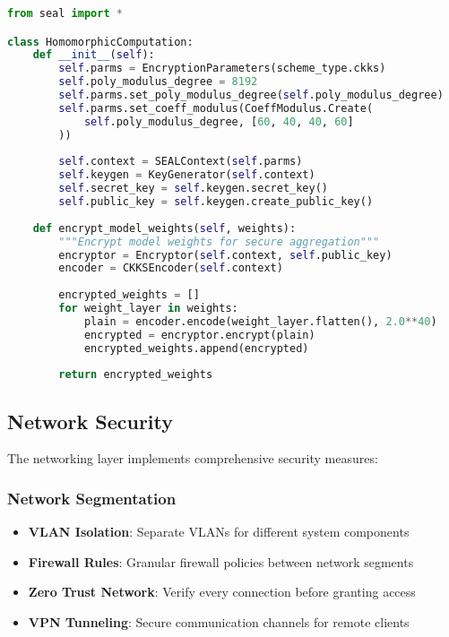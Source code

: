 \begin{lstlisting}[language=python, caption=Homomorphic Encryption Integration]
from seal import *

class HomomorphicComputation:
    def __init__(self):
        self.parms = EncryptionParameters(scheme_type.ckks)
        self.poly_modulus_degree = 8192
        self.parms.set_poly_modulus_degree(self.poly_modulus_degree)
        self.parms.set_coeff_modulus(CoeffModulus.Create(
            self.poly_modulus_degree, [60, 40, 40, 60]
        ))
        
        self.context = SEALContext(self.parms)
        self.keygen = KeyGenerator(self.context)
        self.secret_key = self.keygen.secret_key()
        self.public_key = self.keygen.create_public_key()
        
    def encrypt_model_weights(self, weights):
        """Encrypt model weights for secure aggregation"""
        encryptor = Encryptor(self.context, self.public_key)
        encoder = CKKSEncoder(self.context)
        
        encrypted_weights = []
        for weight_layer in weights:
            plain = encoder.encode(weight_layer.flatten(), 2.0**40)
            encrypted = encryptor.encrypt(plain)
            encrypted_weights.append(encrypted)
            
        return encrypted_weights
\end{lstlisting}

\subsection{Network Security}

The networking layer implements comprehensive security measures:

\subsubsection{Network Segmentation}
\begin{itemize}
    \item \textbf{VLAN Isolation}: Separate VLANs for different system components
    \item \textbf{Firewall Rules}: Granular firewall policies between network segments
    \item \textbf{Zero Trust Network}: Verify every connection before granting access
    \item \textbf{VPN Tunneling}: Secure communication channels for remote clients
\end{itemize}

